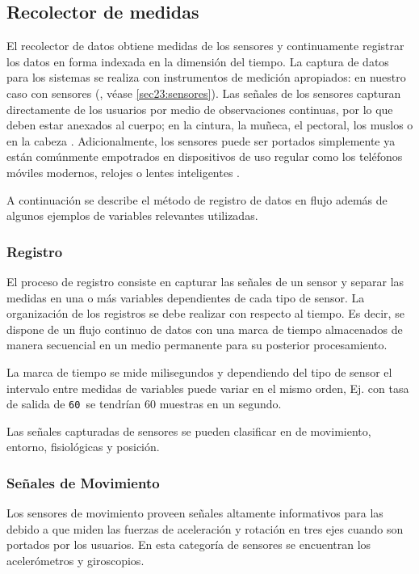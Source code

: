 \subsection{Recolector de medidas}

\label{sec421:recolector-datos}El recolector de datos obtiene medidas
de los sensores y continuamente registrar los datos en forma indexada
en la dimensión del tiempo. La captura de datos para los sistemas
 se realiza con instrumentos de medición apropiados: en
nuestro caso con sensores (, véase \ref{sec23:sensores}).
Las señales de los sensores capturan directamente de los usuarios
por medio de observaciones continuas, por lo que deben estar anexados
al cuerpo; en la cintura, la muñeca, el pectoral, los muslos o en
la cabeza \cite{Bao2004}. Adicionalmente, los sensores puede ser
portados simplemente ya están comúnmente empotrados en dispositivos
de uso regular como los teléfonos móviles modernos, relojes o lentes
inteligentes \cite{LaraLabrador2012,Choudhury2008}.

A continuación se describe el método de registro de datos en flujo
además de algunos ejemplos de variables relevantes utilizadas.

\subsubsection{Registro}

El proceso de registro consiste en capturar las señales de un sensor
y separar las medidas en una o más variables dependientes de cada
tipo de sensor. La organización de los registros se debe realizar
con respecto al tiempo. Es decir, se dispone de un flujo continuo
de datos con una marca de tiempo almacenados de manera secuencial
en un medio permanente para su posterior procesamiento. 

La marca de tiempo se mide milisegundos y dependiendo del tipo de
sensor el intervalo entre medidas de variables puede variar en el
mismo orden, Ej. con tasa de salida de \texttt{60  }se tendrían
60 muestras en un segundo. 

Las señales capturadas de sensores se pueden clasificar en de movimiento,
entorno, fisiológicas y posición.

\subsubsection{Señales de Movimiento}

Los sensores de movimiento proveen señales altamente informativos
para las  debido a que miden las fuerzas de aceleración
y rotación en tres ejes cuando son portados por los usuarios. En esta
categoría de sensores se encuentran los acelerómetros y giroscopios. 

